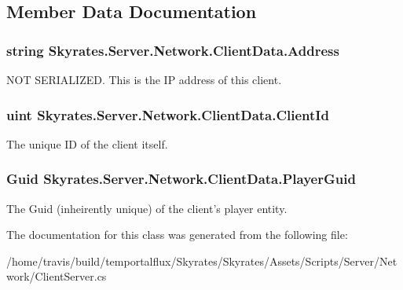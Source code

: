 \subsection{Member Data Documentation}
\hypertarget{class_skyrates_1_1_server_1_1_network_1_1_client_data_a09baae028286a5c98135e9a247d5c27c}{
\subsubsection[{Address}]{\setlength{\rightskip}{0pt plus 5cm}string Skyrates.\-Server.\-Network.\-Client\-Data.\-Address}}\label{class_skyrates_1_1_server_1_1_network_1_1_client_data_a09baae028286a5c98135e9a247d5c27c}


N\-O\-T S\-E\-R\-I\-A\-L\-I\-Z\-E\-D. This is the I\-P address of this client. 

\hypertarget{class_skyrates_1_1_server_1_1_network_1_1_client_data_aac65d3f831d9663be5dc72fe934ac8ea}{
\subsubsection[{Client\-Id}]{\setlength{\rightskip}{0pt plus 5cm}uint Skyrates.\-Server.\-Network.\-Client\-Data.\-Client\-Id}}\label{class_skyrates_1_1_server_1_1_network_1_1_client_data_aac65d3f831d9663be5dc72fe934ac8ea}


The unique I\-D of the client itself. 

\hypertarget{class_skyrates_1_1_server_1_1_network_1_1_client_data_acce52e282ee92f76cb67afa116469ebb}{
\subsubsection[{Player\-Guid}]{\setlength{\rightskip}{0pt plus 5cm}Guid Skyrates.\-Server.\-Network.\-Client\-Data.\-Player\-Guid}}\label{class_skyrates_1_1_server_1_1_network_1_1_client_data_acce52e282ee92f76cb67afa116469ebb}


The Guid (inheirently unique) of the client's player entity. 



The documentation for this class was generated from the following file\-:\begin{DoxyCompactItemize}
\item 
/home/travis/build/temportalflux/\-Skyrates/\-Skyrates/\-Assets/\-Scripts/\-Server/\-Network/Client\-Server.\-cs\end{DoxyCompactItemize}
